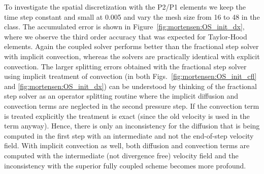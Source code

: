 To investigate the spatial discretization with the P2/P1 elements we
keep the time step constant and small at 0.005 and vary the mesh size
from 16 to 48 in the  class. The accumulated error is
shown in Figure~\ref{fig:mortensen:OS_init_dx}, where we observe the
third order accuracy that was expected for Taylor-Hood elements. Again
the coupled solver performs better than the fractional step solver
with implicit convection, whereas the solvers are practically
identical with explicit convection. The larger splitting errors
obtained with the fractional step solver using implicit treatment of
convection (in both Figs.~\ref{fig:mortensen:OS_init_cfl} and
\ref{fig:mortensen:OS_init_dx}) can be understood by thinking of the
fractional step solver as an operator splitting routine where the
implicit diffusion and convection terms are neglected in the second
pressure step. If the convection term is treated explicitly the
treatment is exact (since the old velocity is used in the term
anyway). Hence, there is only an inconsistency for the diffusion that
is being computed in the first step with an intermediate and not the
end-of-step velocity field. With implicit convection as well, both
diffusion and convection terms are computed with the intermediate (not
divergence free) velocity field and the inconsistency with the
superior fully coupled scheme becomes more profound.

